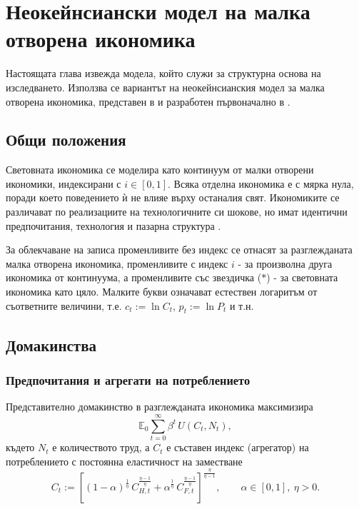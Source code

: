 \chapter{Неокейнсиански модел на малка отворена икономика}
\label{ch:model}

Настоящата глава извежда модела, който служи за структурна основа на изследването. Използва се вариантът на неокейнсианския модел за малка отворена икономика, представен в \textcite[гл.~7]{Gali2008} и разработен първоначално в \textcite{Gali_Monacelli2005}.

\section{Общи положения}

Световната икономика се моделира като континуум от малки отворени икономики, индексирани с $i \in [0,1]$. Всяка отделна икономика е с мярка нула, поради което поведението ѝ не влияе върху останалия свят. Икономиките се различават по реализациите на технологичните си шокове, но имат идентични предпочитания, технология и пазарна структура \parencite[с.~151]{Gali2008}.

За облекчаване на записа променливите без индекс се отнасят за разглежданата малка отворена икономика, променливите с индекс $i$ - за произволна друга икономика от континуума, а променливите със звездичка ($*$) - за световната икономика като цяло. Малките букви означават естествен логаритъм от съответните величини, т.е. $c_t := \ln C_t$, $p_t := \ln P_t$ и т.н.

\section{Домакинства}

\subsection{Предпочитания и агрегати на потреблението}

Представително домакинство в разглежданата икономика максимизира
\begin{equation}
\mathbb{E}_0 \sum_{t=0}^{\infty} \beta^t\, U(C_t, N_t),
\label{eq:hh_objective}
\end{equation}
където $N_t$ е количеството труд, а $C_t$ е съставен индекс (агрегатор) на потреблението с постоянна еластичност на заместване
\begin{equation}
C_t := \left[ (1-\alpha)^{\frac{1}{\eta}} \, C_{H,t}^{\frac{\eta-1}{\eta}}
+ \alpha^{\frac{1}{\eta}} \, C_{F,t}^{\frac{\eta-1}{\eta}} \right]^{\frac{\eta}{\eta-1}},
\qquad \alpha \in [0,1],\ \eta > 0.
\label{eq:C_index}
\end{equation}

